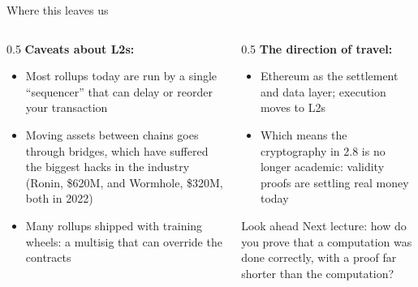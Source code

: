\ifdefined\PRESENTATION\else\PassOptionsToClass{handout}{beamer}\fi\documentclass[aspectratio=169, lualatex]{beamer}
\begin{document}
\begin{frame}{Where this leaves us}
	\begin{columns}[c]
		\begin{column}{0.5\textwidth}
			\textbf{Caveats about L2s:}
			\begin{itemize}
				\item Most rollups today are run by a single ``sequencer'' that can delay or reorder your transaction
				\item Moving assets between chains goes through bridges, which have suffered the biggest hacks in the industry (Ronin, \$620M, and Wormhole, \$320M, both in 2022)
				\item Many rollups shipped with training wheels: a multisig that can override the contracts
			\end{itemize}
		\end{column}
		\begin{column}{0.5\textwidth}
			\textbf{The direction of travel:}
			\begin{itemize}
				\item Ethereum as the settlement and data layer; execution moves to L2s
				\item Which means the cryptography in 2.8 is no longer academic: validity proofs are settling real money today
			\end{itemize}
			\begin{exampleblock}{Look ahead}
				Next lecture: how do you prove that a computation was done correctly, with a proof far shorter than the computation?
			\end{exampleblock}
		\end{column}
	\end{columns}
\end{frame}
\end{document}
